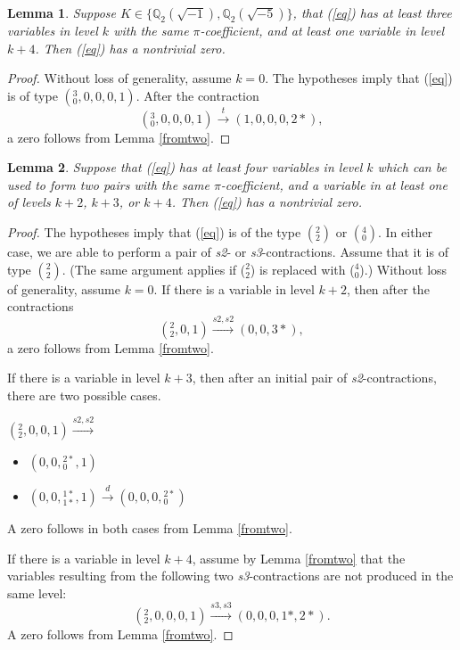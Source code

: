 \documentclass[12pt]{amsart}
\newtheorem{lemma}{Lemma}
\begin{document}
\begin{lemma}\label{empty4}
Suppose $K \in \{\mathbb{Q}_2(\sqrt{-1}), \mathbb{Q}_2(\sqrt{-5})\}$, that (\ref{eq}) has at least three variables in level $k$  with the same $\pi$-coefficient, and at least one variable in level $k+4$.  Then (\ref{eq}) has a nontrivial zero.
\end{lemma}
\begin{proof}
Without loss of generality, assume $k=0$.  The hypotheses imply that (\ref{eq}) is of type $({}^{3}_{0},0,0,0,1)$.  After the contraction
$$({}^{3}_{0}, 0, 0, 0, 1) \xrightarrow{t} (1, 0, 0, 0, 2*),$$
a zero follows from Lemma \ref{fromtwo}.
\end{proof}

\begin{lemma} \label{empty234}
Suppose that (\ref{eq}) has at least four variables in level $k$ which can be used to form two pairs with the same $\pi$-coefficient, and a variable in at least one of levels $k+2$, $k+3$, or $k+4$.  Then (\ref{eq}) has a nontrivial zero.
\end{lemma}
\begin{proof}

The hypotheses imply that (\ref{eq}) is of the type $({}^{2}_{2})$ or $({}^{4}_{0})$.  In either case, we are able to perform a pair of \textit{s2}- or \textit{s3}-contractions.  Assume that it is of type $({}^{2}_{2})$.  (The same argument applies if (${}^{2}_{2}$) is replaced with (${}^{4}_{0}$).)  Without loss of generality, assume $k=0$.  If there is a variable in level $k+2$, then after the contractions
$$({}^{2}_{2}, 0, 1) \xrightarrow{s2, s2} (0, 0, 3*),$$
a zero follows from Lemma \ref{fromtwo}.

If there is a variable in level $k+3$, then after an initial pair of \textit{s2}-contractions, there are two possible cases.

$({}^{2}_{2}, 0, 0 ,1) \xrightarrow{s2,s2}$
\begin{itemize}
    \item $(0, 0, {}^{2*}_{0}, 1)$
    \item $(0, 0, {}^{1*}_{1*}, 1) \xrightarrow{d} (0, 0, 0, {}^{2*}_{0})$
\end{itemize}
A zero follows in both cases from Lemma \ref{fromtwo}.

If there is a variable in level $k+4$, assume by Lemma \ref{fromtwo} that the variables resulting from the following two \textit{s3}-contractions are not produced in the same level:
$$({}^{2}_{2}, 0, 0 ,0, 1) \xrightarrow{s3, s3} (0, 0, 0, 1*, 2*).$$
A zero follows from Lemma \ref{fromtwo}.

\end{proof}
\end{document}
